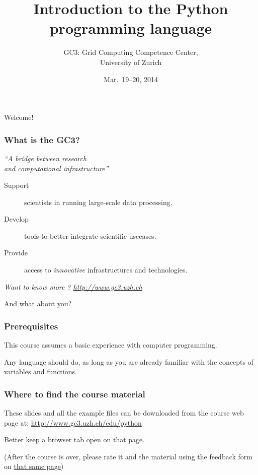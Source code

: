 \documentclass[english,serif,mathserif,xcolor=pdftex,dvipsnames,table]{beamer}
\title[Introduction]{%
  Introduction to the Python programming language
}
\author[GC3]{%
  GC3: Grid Computing Competence Center, \\
  University of Zurich
}
\date{Mar.~19--20, 2014}
\begin{document}
\maketitle

\begin{frame}
  \begin{center}
    {\Huge Welcome!}
  \end{center}
\end{frame}


\begin{frame}
  \frametitle{What is the GC3?}

  \begin{center}
    {\em ``A bridge between research \\ and computational infrastructure''}

    \+
    \begin{description}
    \item[Support] scientists in running large-scale data processing.
    \item[Develop] tools to better integrate scientific usecases.
    \item[Provide] access to {\em innovative} infrastructures and technologies.
    \end{description}

    \+
    {\em \small{Want to know more ? }\url{http://www.gc3.uzh.ch}}
  \end{center}
\end{frame}


\begin{frame}
  \begin{center}
    {\Huge And what about you?}
  \end{center}
\end{frame}


\begin{frame}
  \frametitle{Prerequisites}
  This course assumes a basic experience with computer programming.

  \+
  Any language should do, as long as you are already familiar with
  the concepts of variables and functions.
\end{frame}


\begin{frame}
  \frametitle{Where to find the course material}

  These slides and all the example files can be downloaded from the
  course web page at:
  {\small\url{http://www.gc3.uzh.ch/edu/python}}

  \+
  Better keep a browser tab open on that page.

  \+
  (After the course is over, please rate it and the material using
  the feedback form on \href{http://www.gc3.uzh.ch/edu/python}{that
    same page})
\end{frame}
\end{document}

